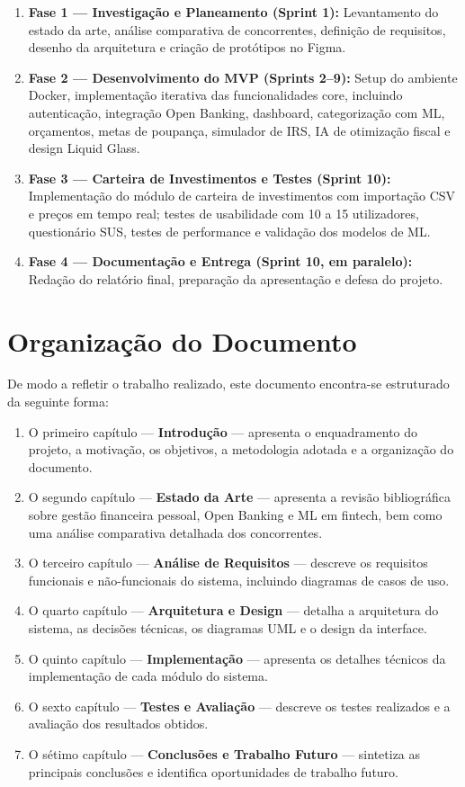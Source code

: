 \begin{enumerate}
    \item \textbf{Fase 1 --- Investigação e Planeamento (Sprint 1):} Levantamento do estado da arte, análise comparativa de concorrentes, definição de requisitos, desenho da arquitetura e criação de protótipos no Figma.
    \item \textbf{Fase 2 --- Desenvolvimento do \ac{MVP} (Sprints 2--9):} Setup do ambiente Docker, implementação iterativa das funcionalidades core, incluindo autenticação, integração Open Banking, dashboard, categorização com \ac{ML}, orçamentos, metas de poupança, simulador de \ac{IRS}, \ac{IA} de otimização fiscal e design Liquid Glass.
    \item \textbf{Fase 3 --- Carteira de Investimentos e Testes (Sprint 10):} Implementação do módulo de carteira de investimentos com importação CSV e preços em tempo real; testes de usabilidade com 10 a 15 utilizadores, questionário \ac{SUS}, testes de performance e validação dos modelos de \ac{ML}.
    \item \textbf{Fase 4 --- Documentação e Entrega (Sprint 10, em paralelo):} Redação do relatório final, preparação da apresentação e defesa do projeto.
\end{enumerate}


\section{Organização do Documento}
\label{sec:organizacao}

De modo a refletir o trabalho realizado, este documento encontra-se estruturado da seguinte forma:

\begin{enumerate}
    \item O primeiro capítulo --- \textbf{Introdução} --- apresenta o enquadramento do projeto, a motivação, os objetivos, a metodologia adotada e a organização do documento.
    \item O segundo capítulo --- \textbf{Estado da Arte} --- apresenta a revisão bibliográfica sobre gestão financeira pessoal, Open Banking e \ac{ML} em fintech, bem como uma análise comparativa detalhada dos concorrentes.
    \item O terceiro capítulo --- \textbf{Análise de Requisitos} --- descreve os requisitos funcionais e não-funcionais do sistema, incluindo diagramas de casos de uso.
    \item O quarto capítulo --- \textbf{Arquitetura e Design} --- detalha a arquitetura do sistema, as decisões técnicas, os diagramas \ac{UML} e o design da interface.
    \item O quinto capítulo --- \textbf{Implementação} --- apresenta os detalhes técnicos da implementação de cada módulo do sistema.
    \item O sexto capítulo --- \textbf{Testes e Avaliação} --- descreve os testes realizados e a avaliação dos resultados obtidos.
    \item O sétimo capítulo --- \textbf{Conclusões e Trabalho Futuro} --- sintetiza as principais conclusões e identifica oportunidades de trabalho futuro.
\end{enumerate}
